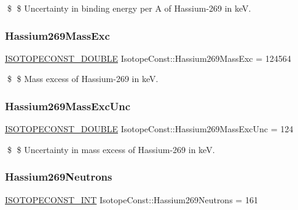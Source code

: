 \$ \$ Uncertainty in binding energy per A of Hassium-\/269 in keV. \mbox{\label{group___isotope_const-_hassium-_hs269_gac325ceee24fec22458fd9e1a2a8908b4}} 
\subsubsection{\texorpdfstring{Hassium269\+Mass\+Exc}{Hassium269MassExc}}
{\footnotesize\ttfamily \mbox{\hyperlink{group___isotope_const-_macros_ga8f45a7272ce02c0b4c65c44636ed719a}{I\+S\+O\+T\+O\+P\+E\+C\+O\+N\+S\+T\+\_\+\+D\+O\+U\+B\+LE}} Isotope\+Const\+::\+Hassium269\+Mass\+Exc = 124564}

\$ \$ Mass excess of Hassium-\/269 in keV. \mbox{\label{group___isotope_const-_hassium-_hs269_ga427332ceebbdcfbc2c40d7388d9fa4cd}} 
\subsubsection{\texorpdfstring{Hassium269\+Mass\+Exc\+Unc}{Hassium269MassExcUnc}}
{\footnotesize\ttfamily \mbox{\hyperlink{group___isotope_const-_macros_ga8f45a7272ce02c0b4c65c44636ed719a}{I\+S\+O\+T\+O\+P\+E\+C\+O\+N\+S\+T\+\_\+\+D\+O\+U\+B\+LE}} Isotope\+Const\+::\+Hassium269\+Mass\+Exc\+Unc = 124}

\$ \$ Uncertainty in mass excess of Hassium-\/269 in keV. \mbox{\label{group___isotope_const-_hassium-_hs269_ga33589eab560cc48e23fbffe1baa4f45c}} 
\subsubsection{\texorpdfstring{Hassium269\+Neutrons}{Hassium269Neutrons}}
{\footnotesize\ttfamily \mbox{\hyperlink{group___isotope_const-_macros_ga5f18360b3e99483a35c32d789e62621c}{I\+S\+O\+T\+O\+P\+E\+C\+O\+N\+S\+T\+\_\+\+I\+NT}} Isotope\+Const\+::\+Hassium269\+Neutrons = 161}

